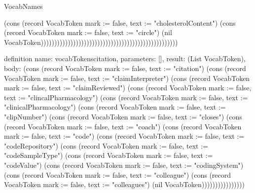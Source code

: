 \begin{lexlean}{VocabNames}
\begin{semanticmodule}
{(cons (record VocabToken {mark := false, text := "cholesterolContent"}) (cons (record VocabToken {mark := false, text := "circle"}) (nil VocabToken)))))))))))))))))))))))))))))))))))))))))))))))))))
}

definition{
  name: vocabTokenscitation,
  parameters: [],
  result: (List VocabToken),
  body: (cons (record VocabToken {mark := false, text := "citation"}) (cons (record VocabToken {mark := false, text := "claimInterpreter"}) (cons (record VocabToken {mark := false, text := "claimReviewed"}) (cons (record VocabToken {mark := false, text := "clincalPharmacology"}) (cons (record VocabToken {mark := false, text := "clinicalPharmacology"}) (cons (record VocabToken {mark := false, text := "clipNumber"}) (cons (record VocabToken {mark := false, text := "closes"}) (cons (record VocabToken {mark := false, text := "coach"}) (cons (record VocabToken {mark := false, text := "code"}) (cons (record VocabToken {mark := false, text := "codeRepository"}) (cons (record VocabToken {mark := false, text := "codeSampleType"}) (cons (record VocabToken {mark := false, text := "codeValue"}) (cons (record VocabToken {mark := false, text := "codingSystem"}) (cons (record VocabToken {mark := false, text := "colleague"}) (cons (record VocabToken {mark := false, text := "colleagues"}) (nil VocabToken))))))))))))))))
}


\end{semanticmodule}
\end{lexlean}
